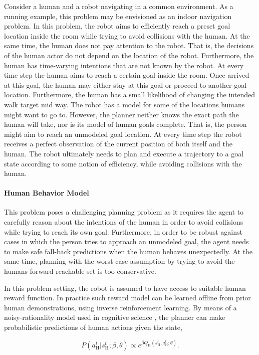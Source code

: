 Consider a human and a robot navigating in a common environment. As a running
example, this problem may be envisioned as an indoor navigation problem. In
this problem, the robot aims to efficiently reach a preset goal location
inside the room while trying to avoid collisions with the human. At the same
time, the human does not pay attention to the robot. That is, the decisions of
the human actor do not depend on the location of the robot. Furthermore, the
human has time-varying intentions that are not known by the robot. At every
time step the human aims to reach a certain goal inside the room. Once arrived
at this goal, the human may either stay at this goal or proceed to another goal
location. Furthermore, the human has a small likelihood of changing the
intended walk target mid way. The robot has a model for some of the locations
humans might want to go to. However, the planner neither knows the exact path
the human will take, nor is its model of human goals complete. That is, the
person might aim to reach an unmodeled goal location. At every time step the
robot receives a perfect observation of the current position of both itself and
the human. The robot ultimately needs to plan and execute a trajectory to
a goal state according to some notion of efficiency, while avoiding collisions
with the human.

\paragraph{Human Behavior Model}

This problem poses a challenging planning problem as it requires the agent to
carefully reason about the intentions of the human in order to avoid collisions
while trying to reach its own goal. Furthermore, in order to be robust against
cases in which the person tries to approach an unmodeled goal, the agent needs
to make safe fall-back predictions when the human behaves unexpectedly. At the
same time, planning with the worst case assumption by trying to avoid the
humans forward reachable set is too conservative.

In this problem setting, the robot is assumed to have access to suitable human
reward function. In practice such reward model can be learned offline from
prior human demonstrations, \eg using inverse reinforcement
learning. By means of a noisy-rationality model used in cognitive
science \cite{baker2007goal}, the planner can make probabilistic predictions
of human actions given the state,

\begin{equation}\label{eq:boltzmann}
  P\left(a^t_\text{H} | s^t_\text{H}; \beta, \theta \right) \propto e^{\beta Q_\text{H}\left(s^t_\text{H}, a^t_\text{H}; \theta\right)}.
\end{equation}

